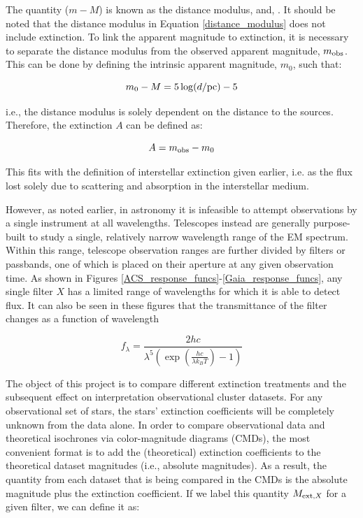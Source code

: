 \documentclass[12pt, a4paper]{report}
\begin{document}
The quantity ($m - M$) is known as the distance modulus, and, . It should be noted that the distance modulus in Equation \ref{distance_modulus} does not include extinction. To link the apparent magnitude to extinction, it is necessary to separate the distance modulus from the observed apparent magnitude, $m_{\textnormal{obs}}$. This can be done by defining the intrinsic apparent magnitude, $m_{0}$, such that:

\begin{equation}
\label{intrinsic_app_mag}
m_{0} - M = 5\log(d/\textnormal{pc}) - 5
\end{equation}

i.e., the distance modulus is solely dependent on the distance to the  sources. Therefore, the extinction $A$ can be defined as:

\begin{equation}
\label{bol_extinc}
A = m_{\textnormal{obs}} - m_{0}
\end{equation}

This fits with the definition of interstellar extinction given earlier, i.e. as the flux lost solely due to scattering and absorption in the interstellar medium.

However, as noted earlier, in astronomy it is infeasible to attempt observations by a single instrument at all wavelengths. Telescopes instead are generally purpose-built to study a single, relatively narrow wavelength range of the EM spectrum. Within this range, telescope observation ranges are further divided by filters or passbands, one of which is placed on their aperture at any given observation time. As shown in Figures \ref{ACS_response_funcs}-\ref{Gaia_response_funcs}, any single filter $X$ has a limited range of wavelengths for which it is able to detect flux. It can also be seen in these figures that the transmittance of the filter changes as a function of wavelength

\begin{equation}
f_{\lambda} = \frac{2hc}{\lambda^{5}\left(\exp\left({\frac{hc}{\lambda k_{B}T}}\right) - 1\right)}
\label{planck_bb}
\end{equation} 

The object of this project is to compare different extinction treatments and the subsequent effect on interpretation observational cluster datasets. For any observational set of stars, the stars' extinction coefficients will be completely unknown from the data alone. In order to compare observational data and theoretical isochrones via color-magnitude diagrams (CMDs), the most convenient format is to add the (theoretical) extinction coefficients to the theoretical dataset magnitudes (i.e., absolute magnitudes). As a result, the quantity from each dataset that is being compared in the CMDs is the absolute magnitude plus the extinction coefficient. If we label this quantity $M_{\textnormal{ext},X}$ for a given filter, we can define it as:
\end{document}
